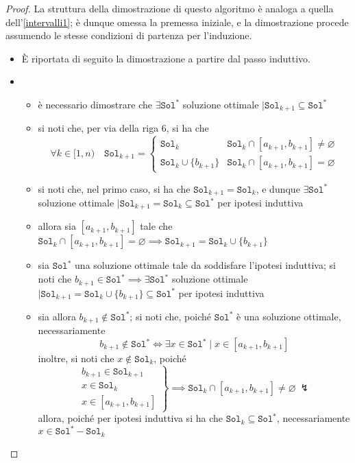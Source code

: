\documentclass[a4paper, 12pt]{report}
\begin{document}
    \begin{proof}
        La struttura della dimostrazione di questo algoritmo è analoga a quella dell'\cref{intervalli1}; è dunque omessa la premessa iniziale, e la dimostrazione procede assumendo le stesse condizioni di partenza per l'induzione.

        \begin{itemize}
            \item[]  È riportata di seguito la dimostrazione a partire dal passo induttivo. 
            \item {}
                \begin{itemize}
                    \item è necessario dimostrare che $\exists \texttt{Sol}^*$ soluzione ottimale $\mid \texttt{Sol}_{k + 1} \subseteq \texttt{Sol}^*$
                    \item si noti che, per via della riga 6, si ha che $$\forall k \in [1, n) \quad \texttt{Sol}_{k +1} = \left \{ \begin{array}{ll} \texttt{Sol}_k & \texttt{Sol}_k \cap [a_{k +1}, b_{k+1}] \neq \varnothing \\ \texttt{Sol}_k \cup \{b_{k +1}\} & \texttt{Sol}_k \cap [a_{k +1}, b_{k +1}] = \varnothing \end{array} \right.$$
                    \item si noti che, nel primo caso, si ha che $\texttt{Sol}_{k +1} = \texttt{Sol}_k$, e dunque $\exists \texttt{Sol}^*$ soluzione ottimale $\mid \texttt{Sol}_{k +1} = \texttt{Sol}_k \subseteq \texttt{Sol}^*$ per ipotesi induttiva
                    \item allora sia $[a_{k+1}, b_{k+1}]$ tale che $\texttt{Sol}_k \cap [a_{k+1}, b_{k +1}] = \varnothing \implies \texttt{Sol}_{k +1} = \texttt{Sol}_k \cup \{b_{k +1}\}$
                    \item sia $\texttt{Sol}^*$ una soluzione ottimale tale da soddisfare l'ipotesi induttiva; si noti che $b_{k +1} \in \texttt{Sol}^* \implies \exists \texttt{Sol}^*$ soluzione ottimale $\mid \texttt{Sol}_{k +1} = \texttt{Sol}_k \cup \{ b_{k +1}\} \subseteq \texttt{Sol}^*$ per ipotesi induttiva
                    \item sia allora $b_{k +1} \notin \texttt{Sol}^*$; si noti che, poiché $\texttt{Sol}^*$ è una soluzione ottimale, necessariamente $$b_{k +1} \notin \texttt{Sol}^* \iff \exists x \in \texttt{Sol}^*  \mid x \in [a_{k + 1}, b_{k +1}]$$ inoltre, si noti che $x \notin \texttt{Sol}_k$, poiché $$\left . \begin{array}{r} b_{k +1} \in \texttt{Sol}_{k +1} \\ x \in \texttt{Sol}_k \\ x \in [a_{k +1}, b_{ k+1}] \end{array} \right \} \implies \texttt{Sol}_k \cap [a_{k +1}, b_{k +1}] \neq \varnothing \ \lightning$$ allora, poiché per ipotesi induttiva si ha che $\texttt{Sol}_k \subseteq \texttt{Sol}^*$, necessariamente $x \in \texttt{Sol}^* - \texttt{Sol}_k$

\end{itemize}
\end{itemize}
\end{proof}
\end{document}
